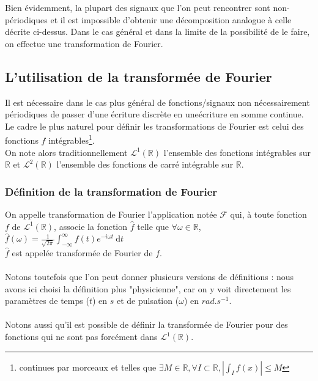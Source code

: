  Bien évidemment, la plupart des signaux que l'on peut rencontrer sont non-périodiques et il est impossible d'obtenir une décomposition analogue à celle décrite ci-dessus. Dans le cas général et dans la limite de la possibilité de le faire, on effectue une transformation de Fourier.

\subsection{L'utilisation de la transformée de Fourier}

Il est nécessaire dans le cas plus général de fonctions/signaux non nécessairement périodiques de passer d'une écriture discrète en uneécriture en somme continue.
\\
Le cadre le plus naturel pour définir les transformations de Fourier est celui des fonctions $f$ intégrables\footnote{continues par morceaux et telles que $ \exists M \in \mathbb{R},\forall I\subset\mathbb{R}, \left|\int_{I}f(x)\right|\leq M$}. 
\\
On note alors traditionnellement $\mathcal{L}^{1}(\mathbb{R})$ l'ensemble des fonctions intégrables sur $\mathbb{R}$ et  $\mathcal{L}^{2}(\mathbb{R})$ l'ensemble des fonctions de carré intégrable sur $\mathbb{R}$.


\subsubsection{Définition de la transformation de Fourier}
 
On appelle transformation de Fourier l'application notée $\mathcal{F}$ qui, à toute fonction $f$ de  $\mathcal{L}^{1}(\mathbb{R})$, associe la fonction $\hat{f}$ telle que $\forall \omega \in \mathbb{R}$,$ \hat{f}(\omega)=\displaystyle{\frac{1}{\sqrt{2\pi}}\int_{-\infty}^{\infty}f(t)e^{-i\omega t}\:\mathrm{d}t}$
\\
$\hat{f}$ est appelée transformée de Fourier de $f$.
\\ \\
Notons toutefois que l'on peut donner plusieurs versions de définitions : nous avons ici choisi la définition plus "physicienne", car on y voit directement les paramètres de temps ($t$) en $s$ et de pulsation ($\omega$) en  $rad.s^{-1}$.
\\ \\
Notons aussi qu'il est possible de définir la transformée de Fourier pour des fonctions qui ne sont pas forcément dans $\mathcal{L}^{1}(\mathbb{R})$.
\\
